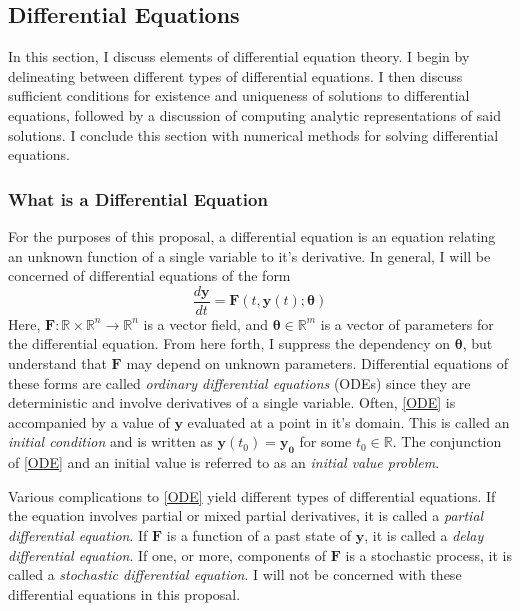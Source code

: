 \subsection{Differential Equations}\label{sec:ODE}

In this section, I discuss elements of differential equation theory.  I begin by delineating between different types of differential equations.  I then discuss sufficient conditions for existence and uniqueness of solutions to differential equations, followed by a discussion of computing analytic representations of said solutions.  I conclude this section with numerical methods for solving differential equations.

\subsubsection{What is a Differential Equation}

For the purposes of this proposal, a differential equation is an equation relating an unknown function of a single variable to it's derivative. In general, I will be concerned of differential equations of the form
%
\begin{equation}\label{ODE}
\dfrac{d \mathbf{y}}{dt}  = \mathbf{F}(t,\mathbf{y}(t);\bm{\theta})
\end{equation}
%
Here, $ \mathbf{F} : \mathbb{R} \times \mathbb{R}^n \rightarrow \mathbb{R}^n $ is a vector field, and $ \bm{\theta} \in \mathbb{R}^m $ is a vector of parameters for the differential equation.  From here forth, I suppress the dependency on $ \bm{\theta} $, but understand that $ \mathbf{F} $ may depend on unknown parameters. Differential equations of these forms are called \textit{ordinary differential equations} (ODEs) since they are deterministic and involve derivatives of a single variable.  Often, \cref{ODE} is accompanied by a value of $ \mathbf{y} $  evaluated at a point in it's domain.  This is called an \textit{initial condition} and is written as $ \mathbf{y}(t_0) = \mathbf{y_0} $ for some $ t_0 \in \mathbb{R}$.  The conjunction of \cref{ODE} and an initial value is referred to as an \textit{initial value problem}.

Various complications to \cref{ODE} yield different types of differential equations. If the equation involves partial or mixed partial derivatives, it is called a \textit{partial differential equation}.  If $ \mathbf{F} $ is a function of a past state of $ \mathbf{y} $, it is called a \textit{delay differential equation}.  If one, or more, components of $ \mathbf{F} $ is a stochastic process, it is called a \textit{stochastic differential equation}.  I will not be concerned with these differential equations in this proposal.

